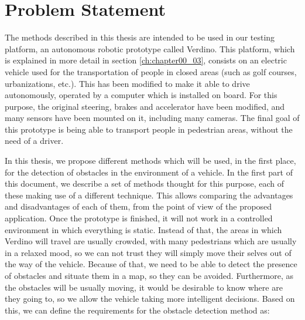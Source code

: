 \section{Problem Statement}\label{ch:chapter00_01}


The methods described in this thesis are intended to be used in our testing platform, an autonomous robotic prototype called Verdino. This platform, which is explained in more detail in section \ref{ch:chapter00_03}, consists on an electric vehicle used for the transportation of people in closed areas (such as golf courses, urbanizations, etc.). This has been modified to make it able to drive autonomously, operated by a computer which is installed on board. For this purpose, the original steering, brakes and accelerator have been modified, and many sensors have been mounted on it, including many cameras. The final goal of this prototype is being able to transport people in pedestrian areas, without the need of a driver.

In this thesis, we propose different methods which will be used, in the first place, for the detection of obstacles in the environment of a vehicle. In the first part of this document, we describe a set of methods thought for this purpose, each of these making use of a different technique. This allows comparing the advantages and disadvantages of each of them, from the point of view of the proposed application. Once the prototype is finished, it will not work in a controlled environment in which everything is static. Instead of that, the areas in which Verdino will travel are usually crowded, with many pedestrians which are usually in a relaxed mood, so we can not trust they will simply move their selves out of the way of the vehicle. Because of that, we need to be able to detect the presence of obstacles and situate them in a map, so they can be avoided. Furthermore, as the obstacles will be usually moving, it would be desirable to know where are they going to, so we allow the vehicle taking more intelligent decisions. Based on this, we can define the requirements for the obstacle detection method as:

